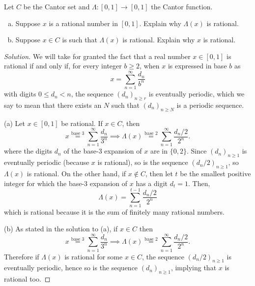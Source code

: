 \documentclass[11pt]{article}
\providecommand{\ii}{\item}
\newenvironment{soln}{\begin{proof}[Solution]}{\end{proof}}
\begin{document}
\pagebreak

\begin{problem}
    Let $C$ be the Cantor set and $\Lambda\colon[0,1]\to[0,1]$ the Cantor function.
    \begin{enumerate}[(a)]
	\ii Suppose $x$ is a rational number in $[0,1]$.
	Explain why $\Lambda(x)$ is rational.
	\ii Suppose $x\in C$ is such that $\Lambda(x)$ is rational.
	Explain why $x$ is rational.
    \end{enumerate}
\end{problem}

\begin{soln}
    We will take for granted the fact that
    a real number $x\in[0,1]$ is rational if and only if,
    for every integer $b\ge 2$, when $x$ is expressed in base $b$ as
    \begin{equation*}
	x = \sum_{n=1}^\infty \frac{d_n}{b^n}
    \end{equation*}
    with digits $0\le d_n<n$, the sequence $(d_n)_{n\ge r}$ is
    eventually periodic, which we say to mean that there exists an $N$
    such that $(d_n)_{n\ge N}$ is a periodic sequence.

    (a) Let $x\in[0,1]$ be rational. If $x\in C$, then
    \begin{equation*}
	x \overset{\text{base 3}}= \sum_{n=1}^\infty \frac{d_n}{3^n}
	\implies
	\Lambda(x) \overset{\text{base 2}}= \sum_{n=1}^\infty \frac{d_n/2}{2^n}.
    \end{equation*}
    where the digits $d_n$ of the base-3 expansion of $x$ are in $\{0,2\}$.
    Since $(d_n)_{n\ge1}$ is eventually periodic (because $x$ is rational),
    so is the sequence $(d_n/2)_{n\ge1}$, so $\Lambda(x)$ is rational.
    On the other hand, if $x\notin C$, then
    let $t$ be the smallest positive integer for which
    the base-3 expansion of $x$ has a digit $d_t = 1$. Then,
    \begin{equation*}
	\Lambda(x) = \sum_{n=1}^{t-1} \frac{d_n/2}{2^n}
    \end{equation*}
    which is rational because it is the sum of finitely many rational numbers.

    (b) As stated in the solution to (a), if $x\in C$ then
    \begin{equation*}
	x \overset{\text{base 3}}= \sum_{n=1}^\infty \frac{d_n}{3^n}
	\implies
	\Lambda(x) \overset{\text{base 2}}= \sum_{n=1}^\infty \frac{d_n/2}{2^n}.
    \end{equation*}
    Therefore if $\Lambda(x)$ is rational for some $x\in C$,
    the sequence $(d_n/2)_{n\ge1}$ is eventually periodic,
    hence so is the sequence $(d_n)_{n\ge1}$,
    implying that $x$ is rational too.
\end{soln}
\end{document}
